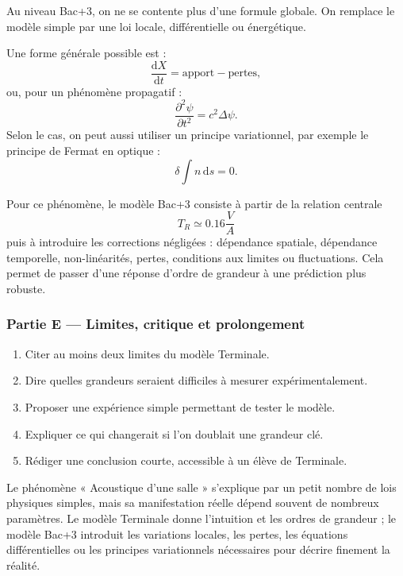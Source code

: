 \documentclass[11pt,a4paper]{article}
\begin{document}
\begin{approfondissementbox}
Au niveau Bac+3, on ne se contente plus d'une formule globale. On remplace le modèle simple par une loi locale, différentielle ou énergétique.

Une forme générale possible est :
\[
\frac{\mathrm d X}{\mathrm dt}=\text{apport}-\text{pertes},
\]
ou, pour un phénomène propagatif :
\[
\frac{\partial^2 \psi}{\partial t^2}=c^2\Delta\psi.
\]
Selon le cas, on peut aussi utiliser un principe variationnel, par exemple le principe de Fermat en optique :
\[
\delta \int n\,\mathrm ds=0.
\]

Pour ce phénomène, le modèle Bac+3 consiste à partir de la relation centrale
\[
T_R\simeq0.16\frac{V}{A}
\]
puis à introduire les corrections négligées : dépendance spatiale, dépendance temporelle, non-linéarités, pertes, conditions aux limites ou fluctuations. Cela permet de passer d'une réponse d'ordre de grandeur à une prédiction plus robuste.
\end{approfondissementbox}

\subsubsection*{Partie E — Limites, critique et prolongement}

\begin{enumerate}
  \item Citer au moins deux limites du modèle Terminale.
  \item Dire quelles grandeurs seraient difficiles à mesurer expérimentalement.
  \item Proposer une expérience simple permettant de tester le modèle.
  \item Expliquer ce qui changerait si l'on doublait une grandeur clé.
  \item Rédiger une conclusion courte, accessible à un élève de Terminale.
\end{enumerate}

\begin{corrigebox}
Le phénomène « Acoustique d'une salle » s'explique par un petit nombre de lois physiques simples, mais sa manifestation réelle dépend souvent de nombreux paramètres. Le modèle Terminale donne l'intuition et les ordres de grandeur ; le modèle Bac+3 introduit les variations locales, les pertes, les équations différentielles ou les principes variationnels nécessaires pour décrire finement la réalité.
\end{corrigebox}
\end{document}
